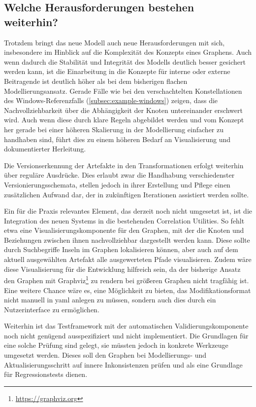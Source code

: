 \subsection{Welche Herausforderungen bestehen weiterhin?}\label{subsec:discussion-negative}

Trotzdem bringt das neue Modell auch neue Herausforderungen mit sich, insbesondere im Hinblick auf die Komplexität des Konzepts eines Graphens.
Auch wenn dadurch die Stabilität und Integrität des Modells deutlich besser gesichert werden kann, ist die Einarbeitung in die Konzepte für interne oder externe Beitragende ist deutlich höher als bei dem bisherigen flachen Modellierungsansatz.
Gerade Fälle wie bei den verschachtelten Konstellationen des Windows-Referenzfalls (\autoref{subsec:example-windows}) zeigen, dass die Nachvollziehbarkeit über die Abhängigkeit der Knoten untereinander erschwert wird.
Auch wenn diese durch klare Regeln abgebildet werden und vom Konzept her gerade bei einer höheren Skalierung in der Modellierung einfacher zu handhaben sind, führt dies zu einem höheren Bedarf an Visualisierung und dokumentierter Herleitung.

Die Versionserkennung der Artefakte in den Transformationen erfolgt weiterhin über reguläre Ausdrücke.
Dies erlaubt zwar die Handhabung verschiedenster Versionierungsschemata, stellen jedoch in ihrer Erstellung und Pflege einen zusätzlichen Aufwand dar, der in zukünftigen Iterationen assistiert werden sollte.

Ein für die Praxis relevantes Element, das derzeit noch nicht umgesetzt ist, ist die Integration des neuen Systems in die bestehenden Correlation Utilities.
So fehlt etwa eine Visualisierungskomponente für den Graphen, mit der die Knoten und Beziehungen zwischen ihnen nachvollziehbar dargestellt werden kann.
Diese sollte durch Suchbegriffe Inseln im Graphen lokalisieren können, aber auch auf dem aktuell ausgewählten Artefakt alle ausgewerteten Pfade visualisieren.
Zudem wäre diese Visualisierung für die Entwicklung hilfreich sein, da der bisherige Ansatz den Graphen mit Graphviz\footnote{\url{https://graphviz.org}} zu rendern bei größeren Graphen nicht tragfähig ist.
Eine weitere Chance wäre es, eine Möglichkeit zu bieten, das Modifikationsformat nicht manuell in \acrshort{yaml} anlegen zu müssen, sondern auch dies durch ein Nutzerinterface zu ermöglichen.

Weiterhin ist das Testframework mit der automatischen Validierungskomponente noch nicht genügend ausspezifiziert und nicht implementiert.
Die Grundlagen für eine solche Prüfung sind gelegt, sie müssten jedoch in konkrete Werkzeuge umgesetzt werden.
Dieses soll den Graphen bei Modellierungs- und Aktualisierungsschritt auf innere Inkonsistenzen prüfen und als eine Grundlage für Regressionstests dienen.

